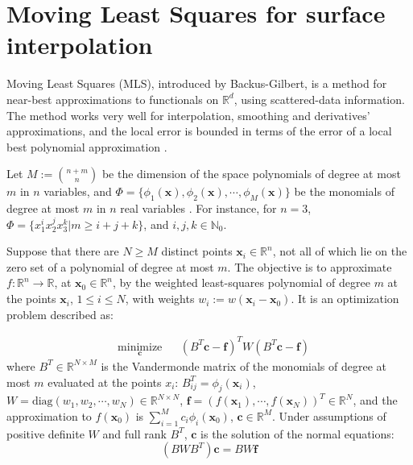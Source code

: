 \section{Moving Least Squares for surface interpolation}
Moving Least Squares (MLS), introduced by Backus-Gilbert, is a method for
near-best approximations to functionals on $\mathbb{R}^d$, using scattered-data
information. The method works very well for interpolation, smoothing and
derivatives' approximations, and the local error is bounded in terms of the
error of a local best polynomial approximation \cite{levin1998approximation}.

Let $M := {n+m \choose n}$ be the dimension of the space polynomials of degree
at most $m$ in $n$ variables, and $\Phi =
\{\phi_1(\textbf{x}),\phi_2(\textbf{x}),\cdots, \phi_M(\textbf{x})\}$ be the
monomials of degree at most $m$ in $n$ real variables \cite{bos1989moving}. For
instance, for $n=3$, $\Phi=\{x_1^i x_2^j x_3^k  | m \geq i+j+k\}$, and $i, j, k
\in \mathbb{N}_0$. 

Suppose that there are $N \geq M$ distinct points
$\textbf{x}_i \in \mathbb{R}^n$, not all of which lie on the zero set of a
polynomial of degree at most $m$. The objective is to approximate
$f:\mathbb{R}^n \rightarrow \mathbb{R}$, at $\textbf{x}_0 \in \mathbb{R}^n$, by
the weighted least-squares polynomial of degree $m$ at the points
$\textbf{x}_i$, $1\leq i \leq N$, with weights $w_i :=
w(\textbf{x}_i-\textbf{x}_0)$. It is an optimization problem described as:

\begin{equation*}
\begin{aligned}
& \underset{\textbf{c}}{\text{minimize}}
& &  (B^T\textbf{c}-\textbf{f})^TW(B^T\textbf{c}-\textbf{f})
\end{aligned}
\end{equation*}
where $B^T \in \mathbb{R}^{N\times M}$ is the Vandermonde matrix of the
monomials of degree at most $m$ evaluated at the points $x_i$:
$B_{ij}^T=\phi_j(\textbf{x}_i)$, $W=\textrm{diag}(w_1,w_2,\cdots,w_N) \in
\mathbb{R}^{N\times N}$, $\textbf{f}=(f(\textbf{x}_1),\cdots,f(\textbf{x}_N))^T
\in \mathbb{R}^N$, and the approximation to $f(\textbf{x}_0)$ is
$\sum_{i=1}^{M}c_i\phi_i(\textbf{x}_0)$, $\textbf{c} \in \mathbb{R}^M$. Under
assumptions of positive definite $W$ and full rank $B^T$, $\textbf{c}$ is the
solution of the normal equations:
\begin{equation}
(BWB^T)\textbf{c}=BW\textbf{f}
\label{eq:2}
\end{equation}

